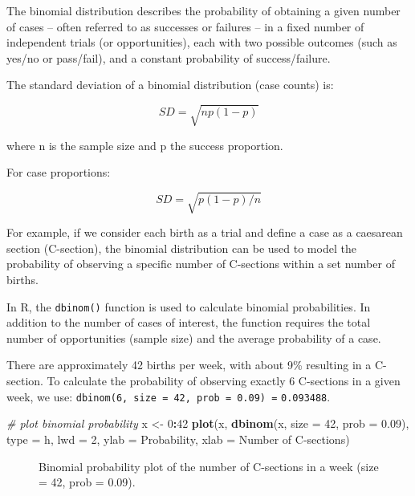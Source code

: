 \documentclass[
]{book}
\makeatletter
\newenvironment{Shaded}{\begin{snugshade}}{\end{snugshade}}
\newcommand{\AttributeTok}[1]{\textcolor[rgb]{0.13,0.29,0.53}{#1}}
\newcommand{\CommentTok}[1]{\textcolor[rgb]{0.56,0.35,0.01}{\textit{#1}}}
\newcommand{\DecValTok}[1]{\textcolor[rgb]{0.00,0.00,0.81}{#1}}
\newcommand{\FloatTok}[1]{\textcolor[rgb]{0.00,0.00,0.81}{#1}}
\newcommand{\FunctionTok}[1]{\textcolor[rgb]{0.13,0.29,0.53}{\textbf{#1}}}
\newcommand{\NormalTok}[1]{#1}
\newcommand{\OtherTok}[1]{\textcolor[rgb]{0.56,0.35,0.01}{#1}}
\newcommand{\SpecialCharTok}[1]{\textcolor[rgb]{0.81,0.36,0.00}{\textbf{#1}}}
\newcommand{\StringTok}[1]{\textcolor[rgb]{0.31,0.60,0.02}{#1}}
\newcommand*\pandocbounded[1]{%
  \sbox\pandoc@box{#1}%
  \Gscale@div\@tempa{\textheight}{\dimexpr\ht\pandoc@box+\dp\pandoc@box\relax}%
  \Gscale@div\@tempb{\linewidth}{\wd\pandoc@box}%
  \ifdim\@tempb\p@<\@tempa\p@\let\@tempa\@tempb\fi%
  \ifdim\@tempa\p@<\p@\scalebox{\@tempa}{\usebox\pandoc@box}%
  \else\usebox{\pandoc@box}%
  \fi%
}
\makeatother
\begin{document}
The binomial distribution describes the probability of obtaining a given
number of cases -- often referred to as successes or failures -- in a
fixed number of independent trials (or opportunities), each with two
possible outcomes (such as yes/no or pass/fail), and a constant
probability of success/failure.

The standard deviation of a binomial distribution (case counts) is:

\[SD = \sqrt{np(1-p)}\]

where n is the sample size and p the success proportion.

For case proportions:

\[SD = \sqrt{p(1-p)/n}\]

For example, if we consider each birth as a trial and define a case as a
caesarean section (C-section), the binomial distribution can be used to
model the probability of observing a specific number of C-sections
within a set number of births.

In R, the \texttt{dbinom()} function is used to calculate binomial
probabilities. In addition to the number of cases of interest, the
function requires the total number of opportunities (sample size) and
the average probability of a case.

There are approximately 42 births per week, with about 9\% resulting in
a C-section. To calculate the probability of observing exactly 6
C-sections in a given week, we use:
\texttt{dbinom(6,\ size\ =\ 42,\ prob\ =\ 0.09)\ =} \texttt{0.093488}.

\begin{Shaded}
\begin{Highlighting}[]
\CommentTok{\# plot binomial probability}
\NormalTok{x }\OtherTok{\textless{}{-}} \DecValTok{0}\SpecialCharTok{:}\DecValTok{42}
\FunctionTok{plot}\NormalTok{(x, }\FunctionTok{dbinom}\NormalTok{(x, }\AttributeTok{size =} \DecValTok{42}\NormalTok{, }\AttributeTok{prob =} \FloatTok{0.09}\NormalTok{), }
     \AttributeTok{type =} \StringTok{\textquotesingle{}h\textquotesingle{}}\NormalTok{, }
     \AttributeTok{lwd  =} \DecValTok{2}\NormalTok{,}
     \AttributeTok{ylab =} \StringTok{\textquotesingle{}Probability\textquotesingle{}}\NormalTok{,}
     \AttributeTok{xlab =} \StringTok{\textquotesingle{}Number of C{-}sections\textquotesingle{}}\NormalTok{)}
\end{Highlighting}
\end{Shaded}

\begin{figure}
\centering
\pandocbounded{}
\caption{Binomial probability plot of the number of C-sections in a week
(size = 42, prob = 0.09).}
\end{figure}
\end{document}

